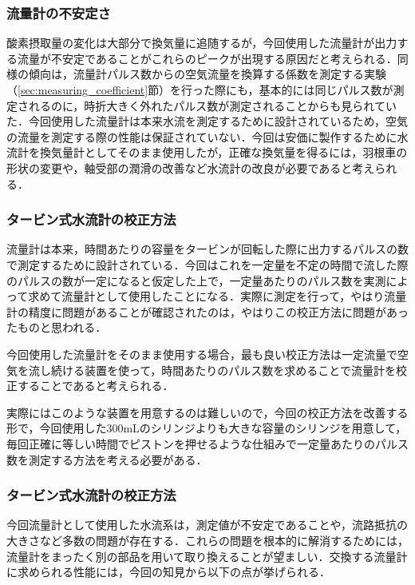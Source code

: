 \subsubsection{流量計の不安定さ}

酸素摂取量の変化は大部分で換気量に追随するが，今回使用した流量計が出力する流量が不安定であることがこれらのピークが出現する原因だと考えられる．同様の傾向は，流量計パルス数からの空気流量を換算する係数を測定する実験（\ref{sec:measuring_coefficient}節）を行った際にも，基本的には同じパルス数が測定されるのに，時折大きく外れたパルス数が測定されることからも見られていた．今回使用した流量計は本来水流を測定するために設計されているため，空気の流量を測定する際の性能は保証されていない．今回は安価に製作するために水流計を換気量計としてそのまま使用したが，正確な換気量を得るには，羽根車の形状の変更や，軸受部の潤滑の改善など水流計の改良が必要であると考えられる．

\subsubsection{タービン式水流計の校正方法}

流量計は本来，時間あたりの容量をタービンが回転した際に出力するパルスの数で測定するために設計されている．今回はこれを一定量を不定の時間で流した際のパルスの数が一定になると仮定した上で，一定量あたりのパルス数を実測によって求めて流量計として使用したことになる．実際に測定を行って，やはり流量計の精度に問題があることが確認されたのは，やはりこの校正方法に問題があったものと思われる．

今回使用した流量計をそのまま使用する場合，最も良い校正方法は一定流量で空気を流し続ける装置を使って，時間あたりのパルス数を求めることで流量計を校正することであると考えられる．

実際にはこのような装置を用意するのは難しいので，今回の校正方法を改善する形で，今回使用した300mLのシリンジよりも大きな容量のシリンジを用意して，毎回正確に等しい時間でピストンを押せるような仕組みで一定量あたりのパルス数を測定する方法を考える必要がある．

\subsubsection{タービン式水流計の校正方法}

今回流量計として使用した水流系は，測定値が不安定であることや，流路抵抗の大きさなど多数の問題が存在する．これらの問題を根本的に解消するためには，流量計をまったく別の部品を用いて取り換えることが望ましい．交換する流量計に求められる性能には，今回の知見から以下の点が挙げられる．


